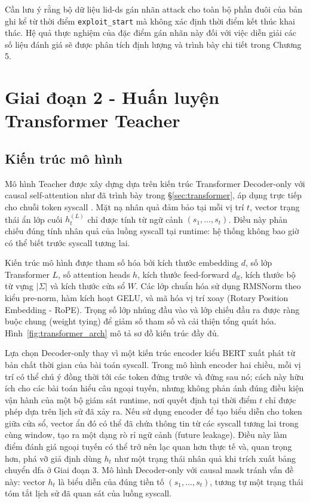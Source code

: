 \documentclass[../main.tex]{subfiles}
\begin{document}
Cần lưu ý rằng bộ dữ liệu \gls{lid-ds} gán nhãn attack cho toàn bộ phần
đuôi của bản ghi kể
từ thời điểm \texttt{exploit\_start} mà không xác định thời điểm kết
thúc khai thác. Hệ
quả thực nghiệm của đặc điểm gán nhãn này đối với việc diễn giải các
số liệu đánh giá
sẽ được phân tích định lượng và trình bày chi tiết trong Chương 5.

\section{Giai đoạn 2 - Huấn luyện Transformer Teacher}
\label{sec:phase2}

\subsection{Kiến trúc mô hình}
\label{sec:teacher_arch}

Mô hình Teacher được xây dựng dựa trên kiến trúc Transformer
Decoder-only với causal
self-attention như đã trình bày trong §\ref{sec:transformer}, áp dụng
trực tiếp cho chuỗi
token \gls{syscall} \cite{fournier2023language,alsiam2026transcall}. Mặt nạ
nhân quả đảm bảo
tại mỗi vị trí $t$, vector trạng thái ẩn lớp cuối $h_t^{(L)}$ chỉ
được tính từ ngữ
cảnh $(s_1, \ldots, s_t)$. Điều này phản chiếu
đúng tính nhân quả của luồng \gls{syscall} tại runtime: hệ thống không bao
giờ có thể biết
trước \gls{syscall} tương lai.

Kiến trúc mô hình được tham số hóa bởi kích thước embedding $d$, số
lớp Transformer $L$, số attention heads $h$, kích thước feed-forward
$d_{\text{ff}}$, kích thước bộ từ vựng $|\Sigma|$ và kích thước cửa
sổ $W$. Các lớp
chuẩn hóa sử dụng RMSNorm theo kiểu pre-norm, hàm kích hoạt GELU, và
mã hóa vị trí
xoay (Rotary Position Embedding - RoPE). Trọng số lớp nhúng đầu vào
và lớp chiếu đầu ra
được ràng buộc chung (weight tying) để giảm số tham số và cải thiện
tổng quát hóa. Hình~\ref{fig:transformer_arch} mô tả sơ đồ kiến trúc đầy đủ.

Lựa chọn Decoder-only thay vì một kiến trúc encoder kiểu BERT xuất
phát từ bản chất
thời gian của bài toán \gls{syscall}. Trong mô hình encoder hai chiều, mỗi
vị trí có thể
chú ý đồng thời tới các token đứng trước và đứng sau nó; cách này hữu
ích cho các bài
toán hiểu câu ngoại tuyến, nhưng không phản ánh đúng điều kiện vận
hành của một bộ
giám sát runtime, nơi quyết định tại thời điểm $t$ chỉ được phép dựa
trên lịch sử đã
xảy ra. Nếu sử dụng encoder để tạo biểu diễn cho token giữa cửa sổ,
vector ẩn đó có
thể đã chứa thông tin từ các \gls{syscall} tương lai trong cùng window, tạo
ra một dạng rò
rỉ ngữ cảnh (future leakage). Điều này làm điểm đánh giá ngoại tuyến
có thể trở nên
lạc quan hơn thực tế và, quan trọng hơn, phá vỡ giả định dùng $h_t$
như một trạng thái
nhân quả khi trích xuất bảng chuyển \gls{dfa} ở Giai đoạn 3. Mô hình
Decoder-only với causal
mask tránh vấn đề này: vector $h_t$ là biểu diễn của đúng tiền tố
$(s_1,\ldots,s_t)$,
tương tự một trạng thái tóm tắt lịch sử đã quan sát của luồng \gls{syscall}.
\end{document}
